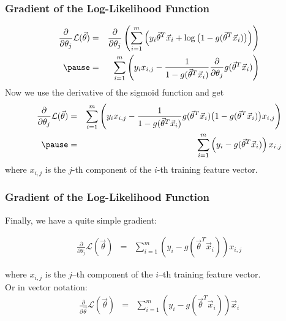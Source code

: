 \begin{frame}
  \frametitle{Gradient of the Log-Likelihood Function}

  {\small
  \begin{eqnarray*}
    \frac{\partial}{\partial \theta_j} \mathcal{L}(\vec \theta)
      &=& \frac{\partial}{\partial \theta_j} \left( \sum_{i=1}^m \left( y_i \vec \theta^T \vec x_i + \log \big( 1 - g(\vec \theta^T \vec x_i) \big) \right) \right)\\ \pause
      &=& \sum_{i=1}^m \left( y_i x_{i,j} - \frac{1}{1-g(\vec \theta^T\vec x_i)} \frac{\partial}{\partial \theta_j}g(\vec \theta^T \vec x_i) \right)
  \end{eqnarray*}
  }
  \pause 
%  
  Now we use the derivative of the sigmoid function and get
%
  {\small
  \begin{eqnarray*}
     \frac{\partial}{\partial \theta_j} \mathcal{L}(\vec \theta) 
       &=& \sum_{i=1}^m \left( y_i x_{i,j} - \frac{1}{1-g(\vec \theta^T\vec x_i)} g(\vec \theta^T \vec x_i) \big(1-g(\vec \theta^T \vec x_i)\big) x_{i,j} \right) \\ \pause
       &=& \sum_{i=1}^m \left( y_i - g(\vec \theta^T\vec x_i) \right) x_{i,j}
  \end{eqnarray*}
  }
% 
   where $x_{i,j}$ is the $j$-th component of the $i$-th training feature vector.
\end{frame}


\begin{frame}
  \frametitle{Gradient of the Log-Likelihood Function \cont}
  
  Finally, we have a quite simple gradient: 
  
  {\small
  \begin{eqnarray*}
    \frac{\partial}{\partial \theta_j} \mathcal{L}(\vec \theta) 
    &=& \sum _{i=1}^m  \left( y_i - g(\vec \theta^T\vec x_i) \right) x_{i,j}
  \end{eqnarray*}
  }

  where $x_{i,j}$ is the $j$--th component of the $i$--th training feature vector. \\[.3cm]
 
  Or in vector notation:
  {\small
  \begin{eqnarray*}
    \frac{\partial}{\partial\vec \theta} \mathcal{L}(\vec \theta) 
    &=& \sum _{i=1}^m  \left( y_i-g(\vec \theta^T\vec x_i) \right)\vec x_{i}
  \end{eqnarray*}
  }
\end{frame}


